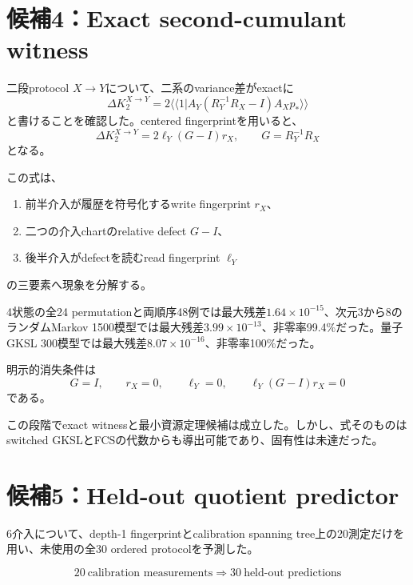 \documentclass[11pt,a4paper,uplatex,dvipdfmx]{bxjsarticle}
\theoremstyle{remark}
\begin{document}
\section{候補4：Exact second-cumulant witness}

二段protocol $X\to Y$について、二系のvariance差がexactに
\begin{equation}
\boxed{
\Delta K_2^{X\to Y}
=2\langle\!\langle1|A_Y(R_Y^{-1}R_X-I)A_Xp_*\rangle\!\rangle
}
\end{equation}
と書けることを確認した。centered fingerprintを用いると、
\begin{equation}
\boxed{
\Delta K_2^{X\to Y}
=2\ell_Y(G-I)r_X,
\qquad G=R_Y^{-1}R_X
}
\end{equation}
となる。

この式は、
\begin{enumerate}
  \item 前半介入が履歴を符号化するwrite fingerprint $r_X$、
  \item 二つの介入chartのrelative defect $G-I$、
  \item 後半介入がdefectを読むread fingerprint $\ell_Y$
\end{enumerate}
の三要素へ現象を分解する。

4状態の全24 permutationと両順序48例では最大残差$1.64\times10^{-15}$、次元3から8のランダムMarkov 1500模型では最大残差$3.99\times10^{-13}$、非零率99.4\%だった。量子GKSL 300模型では最大残差$8.07\times10^{-16}$、非零率100\%だった。

明示的消失条件は
\begin{equation}
G=I,
\qquad
r_X=0,
\qquad
\ell_Y=0,
\qquad
\ell_Y(G-I)r_X=0
\end{equation}
である。

この段階でexact witnessと最小資源定理候補は成立した。しかし、式そのものはswitched GKSLとFCSの代数からも導出可能であり、固有性は未達だった。

\section{候補5：Held-out quotient predictor}

6介入について、depth-1 fingerprintとcalibration spanning tree上の20測定だけを用い、未使用の全30 ordered protocolを予測した。

\begin{equation}
\boxed{
20\ \text{calibration measurements}
\Longrightarrow
30\ \text{held-out predictions}
}
\end{equation}
\end{document}
